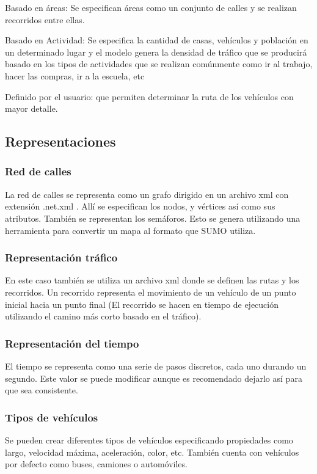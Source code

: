 Basado en áreas:  Se especifican áreas como un conjunto de calles y se realizan recorridos entre ellas.


Basado en Actividad: Se especifica la cantidad de casas, vehículos y población en un determinado lugar y el modelo genera la densidad de tráfico que se producirá basado en los tipos de actividades que se realizan comúnmente como ir al trabajo, hacer las compras, ir a la escuela,  etc

Definido por el usuario: que permiten determinar la ruta de los vehículos con mayor detalle.

\subsection{Representaciones}

\subsubsection{Red de calles}
La red de calles se representa como un grafo dirigido en un archivo xml con extensión .net.xml . Allí se especifican los nodos, y vértices así como sus atributos. También se representan los semáforos. Esto  se genera utilizando una herramienta  para convertir un mapa al formato que SUMO utiliza.

\subsubsection{Representación tráfico}
En este caso también se utiliza un archivo xml donde se definen las rutas y los recorridos. Un recorrido representa el movimiento de un vehículo de un punto inicial hacia un punto final (El recorrido se hacen en tiempo de ejecución utilizando el camino más corto basado en el tráfico). 


\subsubsection{Representación del tiempo}
El tiempo se representa como una serie de pasos discretos, cada uno durando un segundo. Este valor se puede modificar aunque es recomendado dejarlo así para que sea consistente.


\subsubsection{Tipos de vehículos}
Se pueden crear diferentes tipos de vehículos especificando propiedades como largo, velocidad máxima,  aceleración, color, etc. También cuenta con vehículos por defecto como buses, camiones o automóviles.







